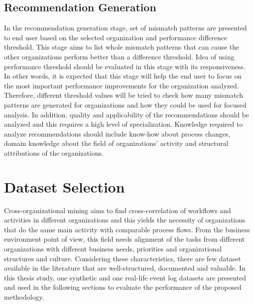 \subsection{Recommendation Generation}
\label{subsec:recommendation-generation-eval}
In the recommendation generation stage, set of mismatch patterns are presented to end user based on the selected organization and performance difference threshold. This stage aims to list whole mismatch patterns that can cause the other organizations perform better than a difference threshold. Idea of using performance threshold should be evaluated in this stage with its responsiveness. In other words, it is expected that this stage will help the end user to focus on the most important performance improvements for the organization analyzed. Therefore, different threshold values will be tried to check how many mismatch patterns are generated for organizations and how they could be used for focused analysis. In addition, quality and applicability of the recommendations should be analyzed and this requires a high level of specialization. Knowledge required to analyze recommendations should include know-how about process changes, domain knowledge about the field of organizations' activity and structural attributions of the organizations.

\section{Dataset Selection}
\label{sec:dataset-selection}
Cross-organizational mining aims to find cross-correlation of workflows and activities in different organizations and this yields the necessity of organizations that do the same main activity with comparable process flows. From the business environment point of view, this field needs alignment of the tasks from different organizations with different business needs, priorities and organizational structures and culture. Considering these characteristics, there are few dataset available in the literature that are well-structured, documented and valuable. In this thesis study, one synthetic and one real-life event log datasets are presented and used in the following sections to evaluate the performance of the proposed methodology.

